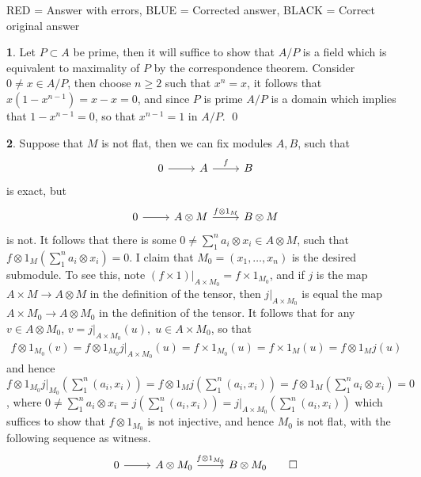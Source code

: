 \documentclass[11pt]{article}
\theoremstyle{definition}
\newtheorem{pb}{}
\begin{document}
    \color{red} RED = Answer with errors, \color{blue} BLUE = Corrected answer, \color{black} BLACK = Correct original answer

    \begin{pb}
        Let \(P \subset A\) be prime, then it will suffice to show that \(A/P\) is a field which is equivalent to maximality of \(P\) by the correspondence theorem. Consider \(0 \neq x \in A/P\), then choose \(n \geq 2\) such that \(x^n = x\), it follows that \(x(1-x^{n-1}) = x-x = 0\), and since \(P\) is prime \(A/P\) is a domain which implies that \(1-x^{n-1} = 0\), so that \(x^{n-1} = 1\) in \(A/P\). \qed
    \end{pb}
    \begin{pb}
        \color{red}
        Suppose that \(M\) is not flat, then we can fix modules \(A,B\), such that
        \begin{equation*}
            \begin{tikzcd}
                0 \arrow[r,"{}"] & A \arrow[r,"{f}"] & B
            \end{tikzcd}
        \end{equation*}
        is exact, but
        \begin{equation*}
            \begin{tikzcd}
                0 \arrow[r,"{}"] & A\otimes M \arrow[r,"{f\otimes1_M}"] & B \otimes M
            \end{tikzcd}
        \end{equation*}
        is not. It follows that there is some \(0 \neq \sum_1^n a_i \otimes x_i \in A \otimes M\), such that \(f\otimes1_M(\sum_1^n a_i\otimes x_i) = 0\). I claim that \(M_0 = (x_1,\hdots,x_n)\) is the desired submodule. To see this, note \((f \times 1)\vert_{A \times M_0} = f\times 1_{M_0}\), and if \(j\) is the map \(A \times M \to A \otimes M\) in the definition of the tensor, then \(j\vert_{A \times M_0}\) is equal the map \(A \times M_0 \to A \otimes M_0\) in the definition of the tensor. It follows that for any \(v \in A \otimes M_0\), \(v = j\vert_{A \times M_0}(u), \; u \in A \times M_0\), so that
        \begin{align*}
            f \otimes 1_{M_0}(v) = f \otimes 1_{M_0}j\vert_{A \times M_0}(u) = f \times 1_{M_0}(u) = f \times 1_M (u) = f\otimes1_Mj(u)
        \end{align*}
        and hence \(f \otimes 1_{M_0}j\vert_{M_0}(\sum_1^n (a_i, x_i)) = f\otimes1_Mj(\sum_1^n (a_i,x_i)) = f\otimes1_M(\sum_1^n a_i \otimes x_i) = 0\), where \(0 \neq \sum_1^n a_i \otimes x_i =  j(\sum_1^n (a_i,x_i)) = j\vert_{A \times M_0}(\sum_1^n (a_i,x_i))\) which suffices to show that \(f \otimes 1_{M_0}\) is not injective, and hence \(M_0\) is not flat, with the following sequence as witness.
        \begin{equation*}
            \begin{tikzcd}
                0 \arrow[r,"{}"] &A \otimes M_0 \arrow[r,"{f \otimes 1_{M_0}}"] &B \otimes M_0 \qed
            \end{tikzcd}
        \end{equation*}
    \end{pb}
\end{document}
